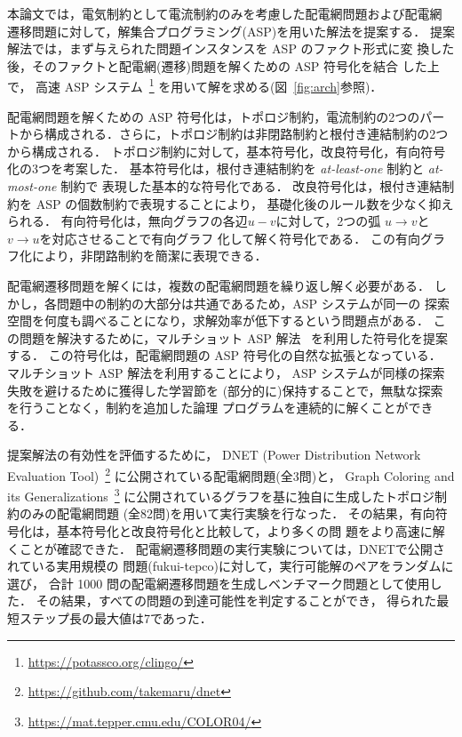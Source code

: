 

本論文では，電気制約として電流制約のみを考慮した配電網問題および配電網
遷移問題に対して，解集合プログラミング(ASP)を用いた解法を提案する．
提案解法では，まず与えられた問題インスタンスを ASP のファクト形式に変
換した後，そのファクトと配電網(遷移)問題を解くための ASP 符号化を結合
した上で，
高速 ASP システム{\clingo}~\footnote{\url{https://potassco.org/clingo/}}
を用いて解を求める(図~\ref{fig:arch}参照)．

配電網問題を解くための ASP 符号化は，トポロジ制約，電流制約の2つのパー
トから構成される．さらに，トポロジ制約は非閉路制約と根付き連結制約の2つ
から構成される．
トポロジ制約に対して，基本符号化，改良符号化，有向符号化の3つを考案した．
基本符号化は，根付き連結制約を \textit{at-least-one} 制約と \textit{at-most-one} 制約で
表現した基本的な符号化である．
改良符号化は，根付き連結制約を ASP の個数制約で表現することにより，
基礎化後のルール数を少なく抑えられる．
有向符号化は，無向グラフの各辺$u-v$に対して，2つの弧
$u\rightarrow v$と$v\rightarrow u$を対応させることで有向グラフ
化して解く符号化である．
この有向グラフ化により，非閉路制約を簡潔に表現できる．

配電網遷移問題を解くには，複数の配電網問題を繰り返し解く必要がある．
しかし，各問題中の制約の大部分は共通であるため，ASP システムが同一の
探索空間を何度も調べることになり，求解効率が低下するという問題点がある．
この問題を解決するために，マルチショット ASP 解法~\cite{DBLP:conf/rweb/KaminskiSW17}
を利用した符号化を提案する．
この符号化は，配電網問題の ASP 符号化の自然な拡張となっている．
マルチショット ASP 解法を利用することにより，
ASP システムが同様の探索失敗を避けるために獲得した学習節を
(部分的に)保持することで，無駄な探索を行うことなく，制約を追加した論理
プログラムを連続的に解くことができる．



提案解法の有効性を評価するために，
DNET (Power Distribution Network Evaluation Tool)~\footnote{%
\url{https://github.com/takemaru/dnet}}
に公開されている配電網問題(全3問)と，
Graph Coloring and its Generalizations~\footnote{%
\url{https://mat.tepper.cmu.edu/COLOR04/}}
に公開されているグラフを基に独自に生成したトポロジ制約のみの配電網問題
(全82問)を用いて実行実験を行なった．
その結果，有向符号化は，基本符号化と改良符号化と比較して，より多くの問
題をより高速に解くことが確認できた．
%
配電網遷移問題の実行実験については，DNETで公開されている実用規模の
問題({\sf fukui-tepco})に対して，実行可能解のペアをランダムに選び，
合計 1000 問の配電網遷移問題を生成しベンチマーク問題として使用した．
その結果，すべての問題の到達可能性を判定することができ，
得られた最短ステップ長の最大値は7であった．


